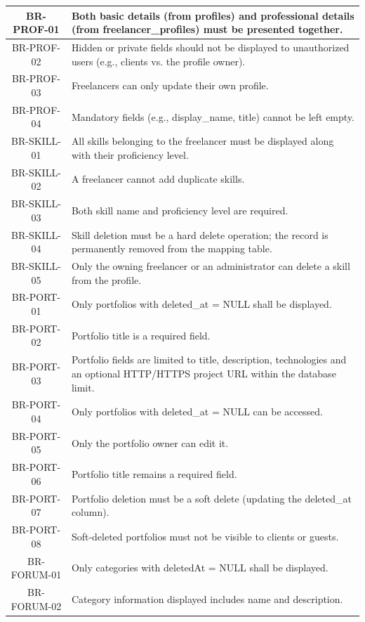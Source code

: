 \begin{longtable}{|c|p{12cm}|}
    BR-PROF-01 & Both basic details (from profiles) and professional details (from freelancer\_profiles) must be presented together. \\ \hline
    BR-PROF-02 & Hidden or private fields should not be displayed to unauthorized users (e.g., clients vs. the profile owner). \\ \hline
    BR-PROF-03 & Freelancers can only update their own profile. \\ \hline
    BR-PROF-04 & Mandatory fields (e.g., display\_name, title) cannot be left empty. \\ \hline
    BR-SKILL-01 & All skills belonging to the freelancer must be displayed along with their proficiency level. \\ \hline
    BR-SKILL-02 & A freelancer cannot add duplicate skills. \\ \hline
    BR-SKILL-03 & Both skill name and proficiency level are required. \\ \hline
    BR-SKILL-04 & Skill deletion must be a hard delete operation; the record is permanently removed from the mapping table. \\ \hline
    BR-SKILL-05 & Only the owning freelancer or an administrator can delete a skill from the profile. \\ \hline
    BR-PORT-01 & Only portfolios with deleted\_at = NULL shall be displayed. \\ \hline
    BR-PORT-02 & Portfolio title is a required field. \\ \hline
    BR-PORT-03 & Portfolio fields are limited to title, description, technologies and an optional HTTP/HTTPS project URL within the database limit. \\ \hline
    BR-PORT-04 & Only portfolios with deleted\_at = NULL can be accessed. \\ \hline
    BR-PORT-05 & Only the portfolio owner can edit it. \\ \hline
    BR-PORT-06 & Portfolio title remains a required field. \\ \hline
    BR-PORT-07 & Portfolio deletion must be a soft delete (updating the deleted\_at column). \\ \hline
    BR-PORT-08 & Soft-deleted portfolios must not be visible to clients or guests. \\ \hline
    BR-FORUM-01 & Only categories with deletedAt = NULL shall be displayed. \\ \hline
    BR-FORUM-02 & Category information displayed includes name and description. \\ \hline

\end{longtable}
